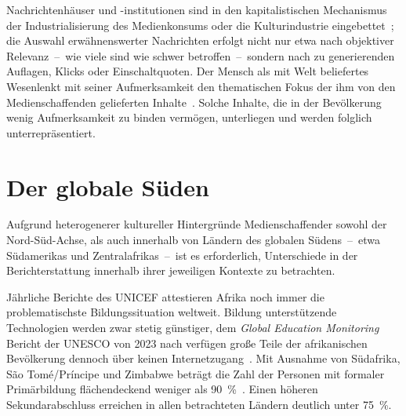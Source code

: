 {%
\vspace{\baselineskip}
\centering

\label{fig:omm}
\vspace{\baselineskip}
}

Nachrichtenhäuser und -institutionen sind in den kapitalistischen Mechanismus der Industrialisierung des Medienkonsums oder die Kulturindustrie eingebettet~\cite{Book.Horkheimer.Kulturindustrie.2024}; die Auswahl erwähnenswerter Nachrichten erfolgt nicht nur etwa nach objektiver Relevanz~--~wie viele sind wie schwer betroffen~--~sondern nach zu generierenden Auflagen, Klicks oder Einschaltquoten.
\glqq Der Mensch als mit Welt beliefertes Wesen\grqq lenkt mit seiner Aufmerksamkeit den thematischen Fokus der ihm von den Medienschaffenden gelieferten Inhalte~\cite{InCollection.Anders.DieWeltAlsPhantomUndMatrize.2019}.
Solche Inhalte, die in der Bevölkerung wenig Aufmerksamkeit zu binden vermögen, unterliegen und werden folglich unterrepräsentiert.


\section{Der globale Süden}

Aufgrund heterogenerer kultureller Hintergründe Medienschaffender sowohl der Nord-Süd-Achse, als auch innerhalb von Ländern des globalen Südens~--~etwa Südamerikas und Zentralafrikas~--~ist es erforderlich, Unterschiede in der Berichterstattung innerhalb ihrer jeweiligen Kontexte zu betrachten.

Jährliche Berichte des UNICEF attestieren Afrika noch immer die problematischste Bildungssituation weltweit.
Bildung unterstützende Technologien werden zwar stetig günstiger,
dem \textit{Global Education Monitoring} Bericht der UNESCO von 2023 nach verfügen große Teile der afrikanischen Bevölkerung dennoch über keinen Internetzugang~\cite{Book.2023GEMReportSummaryTechnologyInEducationAToolOnWhoseTerms.2023}.
Mit Ausnahme von Südafrika, São Tomé/Príncipe und Zimbabwe beträgt die Zahl der Personen mit formaler Primärbildung flächendeckend weniger als \qty{90}{\percent}~\cite{Article..GlobalEducationMonitoringReport.}.
Einen höheren Sekundarabschluss erreichen in allen betrachteten Ländern deutlich unter \qty{75}{\percent}.\par\medskip

